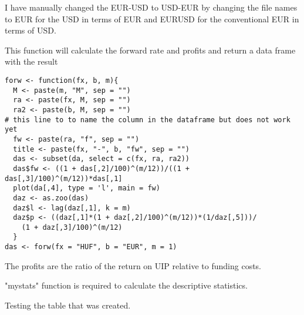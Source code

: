 \documentclass{aRTICLE}\usepackage{graphicx, color}
\begin{document}
I have manually changed the EUR-USD to USD-EUR by changing the file names to EUR for the USD in terms of EUR and EURUSD for the conventional EUR in terms of USD.

This function will calculate the forward rate and profits and return a data frame with the result 

\begin{verbatim}
forw <- function(fx, b, m){
  M <- paste(m, "M", sep = "")
  ra <- paste(fx, M, sep = "")
  ra2 <- paste(b, M, sep = "")
# this line to to name the column in the dataframe but does not work yet
  fw <- paste(ra, "f", sep = "")
  title <- paste(fx, "-", b, "fw", sep = "")
  das <- subset(da, select = c(fx, ra, ra2))
  das$fw <- ((1 + das[,2]/100)^(m/12))/((1 + das[,3]/100)^(m/12))*das[,1]
  plot(da[,4], type = 'l', main = fw)
  daz <- as.zoo(das)
  daz$l <- lag(daz[,1], k = m)
  daz$p <- ((daz[,1]*(1 + daz[,2]/100)^(m/12))*(1/daz[,5]))/
    (1 + daz[,3]/100)^(m/12)
  }
das <- forw(fx = "HUF", b = "EUR", m = 1)
\end{verbatim}
The profits are the ratio of the return on UIP relative to funding costs.  

"mystats" function is required to calculate the descriptive statistics.

Testing the table that was created. 
\end{document}
